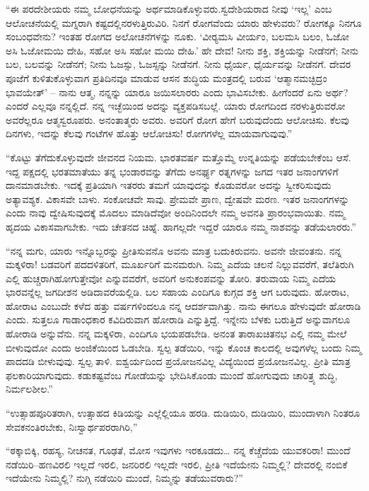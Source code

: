  “ಈ ಪರದೇಶೀಯರು ನಮ್ಮ ಬೋಧನೆಯನ್ನು ಅರ್ಥಮಾಡಿಕೊಳ್ಳುವರು.\break ಸ್ವದೇಶಿಯರಾದ ನೀವು ‘ಇಲ್ಲ’ ಎಂಬ ಆಲೋಚನೆಯಲ್ಲಿ ಮಗ್ನರಾಗಿ ಕಷ್ಟದಲ್ಲಿ\break ನರಳುತ್ತಿರುವಿರಿ. ನಿನಗೆ ರೋಗವೆಂದು ಯಾರು ಹೇಳುವರು? ರೋಗಕ್ಕೂ ನಿನಗೂ ಸಂಬಂಧವೇನು? ಇಂತಹ ರೋಗದ ಅಲೋಚನೆಗಳನ್ನು ನೂಕು. ‘ವೀರ‍್ಯಮಸಿ ವೀರ್ಯಂ, ಬಲಮಸಿ ಬಲಂ, ಓಜೋ ಅಸಿ ಓಜೋಮಯಿ ದೇಹಿ, ಸಹೋ ಅಸಿ ಸಹೋ ಮಯಿ ದೇಹಿ.’ ಹೇ ದೇವ! ನೀನು ಶಕ್ತಿ, ಶಕ್ತಿಯನ್ನು ನೀಡೆನಗೆ; ನೀನು ಬಲ, ಬಲವನ್ನು ನೀಡೆನಗೆ; ನೀನು ಓಜಸ್ಸು, ಓಜಸ್ಸನ್ನು ನೀಡೆನಗೆ. ನೀನು ಧೈರ್ಯ, ಧೈರ್ಯವನ್ನು ನೀಡೆನಗೆ. ದೇವರ ಪೂಜೆಗೆ ಕುಳಿತುಕೊಳ್ಳುವಾಗ ಪ್ರತಿದಿನವೂ ಮಾಡುವ ಆಸನ ಶುದ್ಧಿಯ ಮಂತ್ರದಲ್ಲಿ ಬರುವ ‘ಆತ್ಮಾನಮಚ್ಛಿದ್ರಂ ಭಾವಯೇತ್’ – ನಾನು ಆತ್ಮ, ನನ್ನನ್ನು ಯಾರೂ ಜಯಿಸಲಾರರು ಎಂದು ಭಾವಿಸಬೇಕು. ಹೀಗೆಂದರೆ ಏನು ಅರ್ಥ? ಎಂದರೆ ಎಲ್ಲವೂ ನನ್ನಲ್ಲಿದೆ. ನನ್ನ ಇಚ್ಛೆಯಿಂದ ಅದನ್ನು ವ್ಯಕ್ತಪಡಿಸಬಲ್ಲೆ. ಯಾರು ರೋಗದಿಂದ ನರಳುತ್ತಿರುವರೋ ಅವರೆಲ್ಲರೂ ಆತ್ಮಸ್ವರೂಪರು. ಅನಂತಾತ್ಮರು ಅವರು. ಅವರಿಗೆ ರೋಗ ಹೇಗೆ ಬರುವುದೆಂದು ಆಲೋಚಿಸು. ಕೆಲವು ದಿನಗಳು, ಇದನ್ನು ಕೆಲವು ಗಂಟೆಗಳ ಹೊತ್ತು ಆಲೋಚಿಸು! ರೋಗಗಳೆಲ್ಲ ಮಾಯವಾಗುವುವು.” 

 “ಕೊಟ್ಟು ತೆಗೆದುಕೊಳ್ಳುವುದೇ ಜೀವನದ ನಿಯಮ. ಭಾರತವರ್ಷ ಮತ್ತೊಮ್ಮೆ ಉನ್ನತಿಯನ್ನು ಪಡೆಯಬೇಕೆಂಬ ಆಸೆ. ಇದ್ದ ಪಕ್ಷದಲ್ಲಿ ಭರತಮಾತೆಯು ತನ್ನ ಭಂಡಾರವನ್ನು ತೆಗೆದು ಅನರ್ಘ್ಯ ರತ್ನಗಳನ್ನು ಜಗದ ಇತರ ಜನಾಂಗಗಳಿಗೆ ದಾನಮಾಡಬೇಕು. ಇದಕ್ಕೆ ಪ್ರತಿಯಾಗಿ ಇತರರು ತಮಗೆ ಯಾವುದನ್ನು ಕೊಡುವರೋ ಅದನ್ನು ಸ್ವೀಕರಿಸುವುದು ಅತ್ಯಾವಶ್ಯಕ. ವಿಕಾಸವೇ ಬಾಳು. ಸಂಕೋಚವೇ ಸಾವು. ಪ್ರೇಮವೇ ಪ್ರಾಣ, ದ್ವೇಷವೇ ಮರಣ. ಇತರ ಜನಾಂಗಗಳನ್ನು ಎಂದು ನಾವು ದ್ವೇಷಿಸುವುದಕ್ಕೆ ಮೊದಲು ಮಾಡಿದೆವೋ ಅಂದಿನಿಂದಲೇ ನಮ್ಮ ಅವನತಿ ಪ್ರಾರಂಭವಾಯಿತು. ನಮ್ಮ ಹೃದಯ ವಿಕಾಸವಾಗಬೇಕು. ಇದು ಚೇತನದ ಚಿಹ್ನೆ. ಹಾಗಲ್ಲದೇ ಇದ್ದರೆ ಯಾರೂ ನಮ್ಮ ನಾಶವನ್ನು ತಡೆಯಲಾರರು.” 

 “ನನ್ನ ಮಗು, ಯಾರು ಇನ್ನೊಬ್ಬರನ್ನು ಪ್ರೀತಿಸುವನೊ ಅವನು ಮಾತ್ರ ಬದುಕಿರುವನು. ಅವನೇ ಜೀವಂತನು. ನನ್ನ ಮಕ್ಕಳಿರಾ!‌ ಬಡವರಿಗೆ ಪದದಳಿತರಿಗೆ, ಮೂರ್ಖರಿಗೆ ಮನಮರುಗಿ. ನಿಮ್ಮ ಎದೆಯ ಚಲನೆ ನಿಲ್ಲುವವರೆಗೆ, ತಲೆತಿರುಗಿ ಎಲ್ಲಿ ಹುಚ್ಚರಾಗಿಹೋಗುತ್ತೇವೋ ಎನ್ನುವವರೆಗೆ, ಅವರಿಗೆ ಅನುಕಂಪವನ್ನು ತೋರಿ. ತರುವಾಯ ನಿಮ್ಮ ಎದೆಯ ಭಾರವನ್ನೆಲ್ಲ ಜಗದೀಶನ ಅಡಿದಾವರೆಯಲ್ಲಿಡಿ. ಬಲ ಸಹಾಯ ಎಂದಿಗೂ ಕುಗ್ಗದ ಶಕ್ತಿ ಆಗ ಬರುವುದು. ಹೋರಾಟ, ಹೋರಾಟ ಎಂಬುದೇ ಕಳೆದ ಹತ್ತು ವರ್ಷಗಳಿಂದಲೂ ನನ್ನ ಆದರ್ಶವಾಗಿತ್ತು. ನಾನು ಈಗಲೂ ಹೇಳುವುದೇ ಹೋರಾಡಿ ಎಂದು. ಸುತ್ತಲೂ ಗಾಡಾಂಧಕಾರ ಕವಿದಿರುವಾಗ ಹೋರಾಡಿ ಎನ್ನುತ್ತಿದ್ದೆ. ಇನ್ನೇನು ಬೆಳಕು ಬರುತ್ತಿದೆ ಅನ್ನುವಾಗಲೂ ಹೋರಾಡಿ ಅನ್ನುವೆನು. ನನ್ನ ಮಕ್ಕಳಿರಾ, ಎಂದಿಗೂ ಭಯಪಡಬೇಡಿ. ಅನಂತ ತಾರಾಖಚಿತನಭ ಎಲ್ಲಿ ನಮ್ಮ ಮೇಲೆ ಬೀಳುವುದೋ ಎಂದು ಅಂಜಿಕೆಯಿಂದ ಓಡಬೇಡಿ. ಸ್ವಲ್ಪ ತಡೆಯಿರಿ, ಇನ್ನು ಕೊಂಚ ಕಾಲದಲ್ಲಿ ಅವುಗಳೆಲ್ಲ ಬಂದು ನಿಮ್ಮ ಪಾದದಡಿ ಬೀಳುವುವು. ಸ್ವಲ್ಪ ತಾಳಿ. ಐಶ್ವರ್ಯದಿಂದ ಪ್ರಯೋಜನವಿಲ್ಲ ವಿದ್ಯೆಯಿಂದ ಪ್ರಯೋಜನವಿಲ್ಲ. ಪ್ರೀತಿ ಮಾತ್ರ ಫಲಕಾರಿಯಾಗುವುದು. ಕಡುಕಷ್ಟವೆಂಬ ಗೋಡೆಯನ್ನು ಭೇದಿಸಿಕೊಂಡು ಮುಂದೆ ಹೋಗುವುದು ಚಾರಿತ್ರ್ಯ ಶುದ್ಧಿ, ನಿರ್ಮಲಶೀಲ.” 

 “ಉತ್ಸಾಹಪೂರಿತರಾಗಿ, ಉತ್ಸಾಹದ ಕಿಡಿಯನ್ನು ಎಲ್ಲೆಲ್ಲಿಯೂ ಹರಡಿ. ದುಡಿಯಿರಿ, ದುಡಿಯಿರಿ, ಮುಂದಾಳಾಗಿ ನಿಂತರೂ ಸೇವಕನಂತಿರಬೇಕು, ನಿಃಸ್ವಾರ್ಥಪರರಾಗಿರಿ,” 

 “ಠಕ್ಕಾಬಿಕ್ಕಿ, ರಹಸ್ಯ, ನೀಚನತ, ಗೂಢತೆ, ಮೋಸ ಇವುಗಳು ಇರಕೂಡದು… ನನ್ನ ಕೆಚ್ಚೆದೆಯ ಯುವಕರಿರಾ! ಮುಂದೆ ನಡೆಯಿರಿ–ಹಣವಿರಲಿ ಇಲ್ಲದೆ ಇರಲಿ, ಜನರಿರಲಿ ಇಲ್ಲದೇ ಇರಲಿ, ಪ್ರೀತಿ ಇದೆಯೇನು ನಿಮ್ಮಲ್ಲಿ? ದೇವರಲ್ಲಿ ನಂಬಿಕೆ ಇದೆಯೇನು ನಿಮ್ಮಲ್ಲಿ? ನುಗ್ಗಿ ನಡೆಯಿರಿ ಮುಂದೆ, ನಿಮ್ಮನ್ನು ತಡೆಯುವರಾರು?” 

